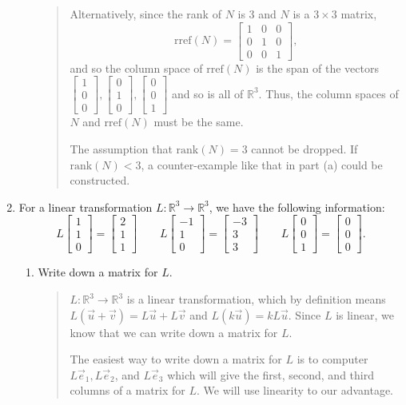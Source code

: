 \documentclass[letter]{article}
\newcommand{\R}{\mathbb{R}}
\newcommand{\Rank}{\mathrm{rank}}
\newcommand{\Rref}{\mathrm{rref}}
\newcommand{\mat}[1]{\begin{bmatrix}#1\end{bmatrix}}
\begin{document}
\begin{enumerate}
\begin{enumerate}
\begin{quote}
					Alternatively, since the rank of $N$ is 3 and $N$ is a $3\times 3$ matrix,
					\[
						\Rref(N) = \mat{1&0&0\\0&1&0\\0&0&1},
					\]
					and so the column space of $\Rref(N)$ is the span of the vectors
					$\mat{1\\0\\0},\mat{0\\1\\0},\mat{0\\0\\1}$ and so is all of $\R^3$.  Thus, 
					the column spaces of $N$ and $\Rref(N)$ must be the same.

					The assumption that $\Rank(N)=3$ cannot be dropped.  If $\Rank(N)<3$, a counter-example
					like that in part (a) could be constructed.
				\end{quote}
		\end{enumerate}
		
		\item For a linear transformation $L:\R^3\to\R^3$, we have the following information:
			\[
				L\mat{1\\1\\0}=\mat{2\\1\\1}\qquad
				L\mat{-1\\1\\0}=\mat{-3\\3\\3}\qquad
				L\mat{0\\0\\1}=\mat{0\\0\\0}.
			\]
		\begin{enumerate}
			\item Write down a matrix for $L$.
				\begin{quote}
					$L:\R^3\to\R^3$ is a linear transformation, which by definition means 
					$L(\vec u+\vec v)=L\vec u+L\vec v$ and $L(k\vec u)=kL\vec u$.  Since $L$ is
					linear, we know that we can write down a matrix for $L$.

					The easiest way to write down a matrix for $L$ is to computer
					$L\vec e_1,L\vec e_2$, and $L\vec e_3$ which will give the first,
					second, and third columns of a matrix for $L$.  We will use linearity
					to our advantage.  


\end{quote}
\end{enumerate}
\end{enumerate}
\end{document}
